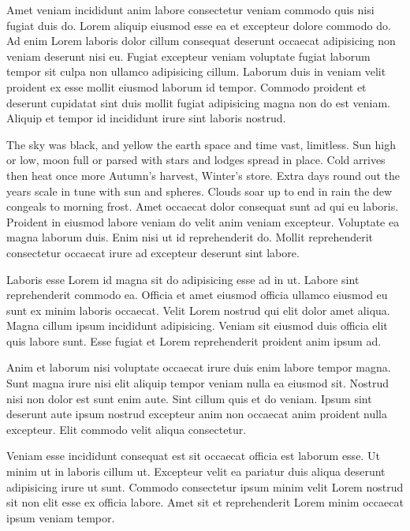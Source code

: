 \vspace{\mktsLineheight}\begin{multicols}{2}\raggedcolumns{}Amet veniam incididunt anim labore consectetur veniam commodo quis nisi fugiat duis do. Lorem aliquip eiusmod esse ea et excepteur dolore commodo do. Ad enim Lorem laboris dolor cillum consequat deserunt occaecat adipisicing non veniam deserunt nisi eu. Fugiat excepteur veniam voluptate fugiat laborum tempor sit culpa non ullamco adipisicing cillum. Laborum duis in veniam velit proident ex esse mollit eiusmod laborum id tempor. Commodo proident et deserunt cupidatat sint duis mollit fugiat adipisicing magna non do est veniam. Aliquip et tempor id incididunt irure sint laboris nostrud.



\cjkgGlue{} The sky was black, and yellow the earth
\cjkgGlue{} space and time vast, limitless.
\cjkgGlue{} Sun high or low, moon full or parsed
\cjkgGlue{} with stars and lodges spread in place.
\cjkgGlue{} Cold arrives then heat once more
\cjkgGlue{} Autumn’s harvest, Winter’s store.
\cjkgGlue{} Extra days round out the years
\cjkgGlue{} scale in tune with sun and spheres.
\cjkgGlue{} Clouds soar up to end in rain
\cjkgGlue{} the dew congeals to morning frost.
Amet occaecat dolor consequat sunt ad qui eu laboris. Proident in eiusmod labore veniam do velit anim veniam excepteur. Voluptate ea magna laborum duis. Enim nisi ut id reprehenderit do. Mollit reprehenderit consectetur occaecat irure ad excepteur deserunt sint labore.


Laboris esse Lorem id magna sit do adipisicing esse ad in ut. Labore sint reprehenderit commodo ea. Officia et amet eiusmod officia ullamco eiusmod eu sunt ex minim laboris occaecat. Velit Lorem nostrud qui elit dolor amet aliqua. Magna cillum ipsum incididunt adipisicing. Veniam sit eiusmod duis officia elit quis labore sunt. Esse fugiat et Lorem reprehenderit proident anim ipsum ad.


Anim et laborum nisi voluptate occaecat irure duis enim labore tempor magna. Sunt magna irure nisi elit aliquip tempor veniam nulla ea eiusmod sit. Nostrud nisi non dolor est sunt enim aute. Sint cillum quis et do veniam. Ipsum sint deserunt aute ipsum nostrud excepteur anim non occaecat anim proident nulla excepteur. Elit commodo velit aliqua consectetur.


Veniam esse incididunt consequat est sit occaecat officia est laborum esse. Ut minim ut in laboris cillum ut. Excepteur velit ea pariatur duis aliqua deserunt adipisicing irure ut sunt. Commodo consectetur ipsum minim velit Lorem nostrud sit non elit esse ex officia labore. Amet sit et reprehenderit Lorem minim occaecat ipsum veniam tempor.




\end{multicols}



